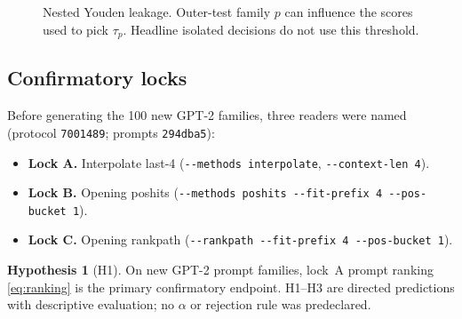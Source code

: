 \documentclass[11pt,a4paper]{article}
\newcommand{\ddash}{\mbox{-}\mbox{-}}
\theoremstyle{definition}
\newtheorem{hypothesis}[definition]{Hypothesis}
\begin{document}
\begin{figure}[ht]
\centering
{}
\caption{Nested Youden leakage. Outer-test family $p$ can influence the
scores used to pick $\tau_p$. Headline isolated decisions do not use
this threshold.}
\label{fig:youden}
\end{figure}

\subsection{Confirmatory locks}
\label{sec:hypotheses}

Before generating the 100 new GPT-2 families, three readers were named
(protocol \texttt{7001489}; prompts \texttt{294dba5}):

\begin{itemize}[leftmargin=*]
\item \textbf{Lock A.} Interpolate last-4
(\texttt{\ddash methods interpolate}, \texttt{\ddash context-len 4}).
\item \textbf{Lock B.} Opening poshits
(\texttt{\ddash methods poshits \ddash fit-prefix 4 \ddash pos-bucket 1}).
\item \textbf{Lock C.} Opening rankpath
(\texttt{\ddash rankpath \ddash fit-prefix 4 \ddash pos-bucket 1}).
\end{itemize}

\begin{hypothesis}[H1]
\label{hyp:h1}
On new GPT-2 prompt families, lock~A prompt ranking
\eqref{eq:ranking} is the primary confirmatory endpoint. H1--H3 are
directed predictions with descriptive evaluation; no $\alpha$ or
rejection rule was predeclared.
\end{hypothesis}
\end{document}
